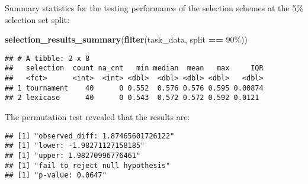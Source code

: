 \documentclass[
]{book}
\newenvironment{Shaded}{\begin{snugshade}}{\end{snugshade}}
\newcommand{\AttributeTok}[1]{\textcolor[rgb]{0.13,0.29,0.53}{#1}}
\newcommand{\DecValTok}[1]{\textcolor[rgb]{0.00,0.00,0.81}{#1}}
\newcommand{\FunctionTok}[1]{\textcolor[rgb]{0.13,0.29,0.53}{\textbf{#1}}}
\newcommand{\NormalTok}[1]{#1}
\newcommand{\OtherTok}[1]{\textcolor[rgb]{0.56,0.35,0.01}{#1}}
\newcommand{\SpecialCharTok}[1]{\textcolor[rgb]{0.81,0.36,0.00}{\textbf{#1}}}
\newcommand{\StringTok}[1]{\textcolor[rgb]{0.31,0.60,0.02}{#1}}
\begin{document}
Summary statistics for the testing performance of the selection schemes at the 5\% selection set split:

\begin{Shaded}
\begin{Highlighting}[]
\FunctionTok{selection\_results\_summary}\NormalTok{(}\FunctionTok{filter}\NormalTok{(task\_data, split }\SpecialCharTok{==} \StringTok{\textquotesingle{}90\%\textquotesingle{}}\NormalTok{))}
\end{Highlighting}
\end{Shaded}

\begin{verbatim}
## # A tibble: 2 x 8
##   selection  count na_cnt   min median  mean   max     IQR
##   <fct>      <int>  <int> <dbl>  <dbl> <dbl> <dbl>   <dbl>
## 1 tournament    40      0 0.552  0.576 0.576 0.595 0.00874
## 2 lexicase      40      0 0.543  0.572 0.572 0.592 0.0121
\end{verbatim}

The permutation test revealed that the results are:

\begin{Shaded}
\end{Shaded}

\begin{verbatim}
## [1] "observed_diff: 1.87465601726122"
## [1] "lower: -1.98271127158185"
## [1] "upper: 1.98270996776461"
## [1] "fail to reject null hypothesis"
## [1] "p-value: 0.0647"
\end{verbatim}
\end{document}
